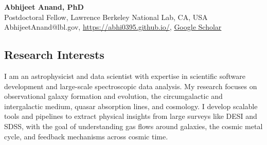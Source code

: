 \documentclass[12pt,letterpaper]{article}
\begin{document}
\thispagestyle{empty}\sloppy\sloppypar\raggedbottom

\textbf{\Large Abhijeet Anand, PhD}\\[0.5ex]
Postdoctoral Fellow, Lawrence Berkeley National Lab, CA, USA\\[0.5ex]
\textsf{\small AbhijeetAnand@lbl.gov, \href{https://abhi0395.github.io/}{https://abhi0395.github.io/}, \href{https://scholar.google.com/citations?hl=en&user=MfOuq1IAAAAJ}{Google Scholar}}\\[0.5ex]

\subsection{Research Interests}

I am an astrophysicist and data scientist with expertise in scientific software development and large-scale spectroscopic data analysis. My research focuses on observational galaxy formation and evolution, the circumgalactic and intergalactic medium, quasar absorption lines, and cosmology. I develop scalable tools and pipelines to extract physical insights from large surveys like DESI and SDSS, with the goal of understanding gas flows around galaxies, the cosmic metal cycle, and feedback mechanisms across cosmic time.

\vspace{-1.5mm}
\end{document}
